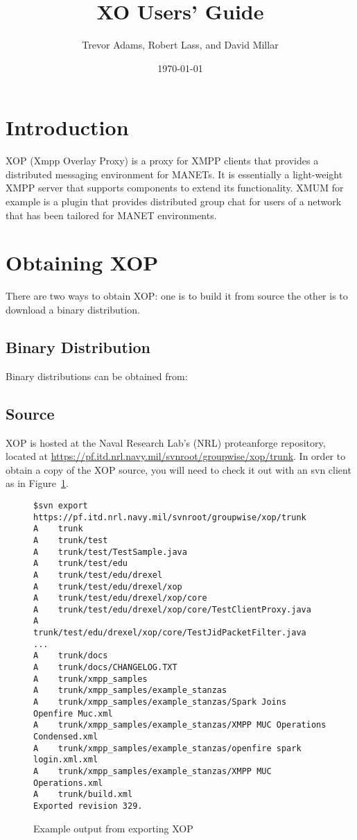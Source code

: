 \documentclass[draft]{article}
\title{XO Users' Guide}
\date{\today}
\author{Trevor Adams, Robert Lass, and David Millar}
\begin{document}
\maketitle


\section{Introduction}
XOP (Xmpp Overlay Proxy) is a proxy for XMPP clients that provides a distributed
messaging environment for MANETs.  It is essentially a light-weight
XMPP server that supports components to extend its functionality.  XMUM for example
is a plugin that provides distributed group chat for users of a network that has
been tailored for MANET environments.


\section{Obtaining XOP}
There are two ways to obtain XOP: one is to build it from source the other is to download a binary distribution.
\subsection{Binary Distribution}

Binary distributions can be obtained from: 

\subsection{Source}
XOP is hosted at the Naval Research Lab's (NRL) proteanforge repository, located at
\url{https://pf.itd.nrl.navy.mil/svnroot/groupwise/xop/trunk}. In order to obtain
a copy of the XOP source, you will need to check it out with an svn client as in
Figure~\ref{fig:svn-export-output}.

\begin{figure}
\begin{verbatim}
$svn export https://pf.itd.nrl.navy.mil/svnroot/groupwise/xop/trunk
A    trunk
A    trunk/test
A    trunk/test/TestSample.java
A    trunk/test/edu
A    trunk/test/edu/drexel
A    trunk/test/edu/drexel/xop
A    trunk/test/edu/drexel/xop/core
A    trunk/test/edu/drexel/xop/core/TestClientProxy.java
A    trunk/test/edu/drexel/xop/core/TestJidPacketFilter.java
...
A    trunk/docs
A    trunk/docs/CHANGELOG.TXT
A    trunk/xmpp_samples
A    trunk/xmpp_samples/example_stanzas
A    trunk/xmpp_samples/example_stanzas/Spark Joins Openfire Muc.xml
A    trunk/xmpp_samples/example_stanzas/XMPP MUC Operations Condensed.xml
A    trunk/xmpp_samples/example_stanzas/openfire spark login.xml.xml
A    trunk/xmpp_samples/example_stanzas/XMPP MUC Operations.xml
A    trunk/build.xml
Exported revision 329.
\end{verbatim}
\caption{Example output from exporting XOP}
\label{fig:svn-export-output}
\end{figure}
\end{document}
